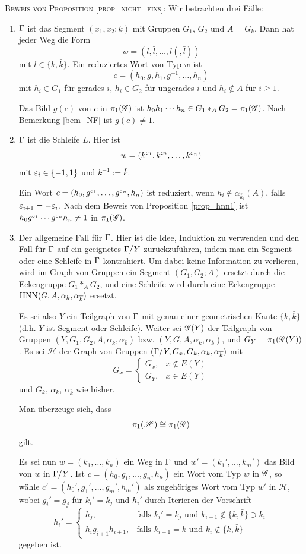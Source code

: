 \documentclass[a4paper, 12pt, twoside]{article}
\begin{document}
\textsc{Beweis von Proposition \ref{prop_nicht_eins}:}
Wir betrachten drei Fälle:
\begin{enumerate}
\item
$\Gamma$ ist das Segment $(x_1,x_2;k)$ mit Gruppen
$G_1$, $G_2$ und $A=G_k$. Dann hat jeder Weg die Form
\[
w = (l,\bar{l},\ldots,l(,\bar{l}))
\]
mit $l\in\{ k, \bar{k} \}$.
Ein reduziertes Wort von Typ $w$ ist
\[
c = (h_0,g,h_1,g^{-1},\ldots,h_n)
\]
mit $h_i\in G_1$ für gerades $i$, $h_i\in G_2$ für ungerades $i$
und $h_i\not\in A$ für $i\geq 1$.

Das Bild $g(c)$ von $c$ in $\pi_1(\mathscr{G})$ ist
$h_0 h_1\cdots h_n \in G_1 *_A G_2=\pi_1(\mathscr{G})$.
Nach Bemerkung \ref{bem_NF} ist $g(c)\neq 1$.

\item
$\Gamma$ ist die Schleife $L$. Hier ist
\[
w = (k^{\varepsilon_1},k^{\varepsilon_2},\ldots,k^{\varepsilon_n})
\]
mit $\varepsilon_i\in\{-1,1\}$ und $k^{-1}:=\bar{k}$.

Ein Wort $c=(h_0,g^{\varepsilon_1},\ldots,g^{\varepsilon_n},h_n)$ ist reduziert,
wenn $h_i\not\in \alpha_{\bar{k}_i}(A)$, falls $\varepsilon_{i+1}=-\varepsilon_i$.
Nach dem Beweis von Proposition \ref{prop_hnn1} ist
$h_0 g^{\varepsilon_1}\cdots g^{\varepsilon_n}h_n\neq 1$ in $\pi_1(\mathscr{G})$.

\item
Der allgemeine Fall für $\Gamma$. Hier ist die Idee, Induktion
zu verwenden und den Fall für $\Gamma$ auf ein geeignetes $\Gamma/Y$
zurückzuführen, indem man ein Segment oder eine Schleife in $\Gamma$
kontrahiert. Um dabei keine Information zu verlieren, wird im
Graph von Gruppen ein Segment $(G_1,G_2;A)$ ersetzt durch
die Eckengruppe $G_1*_A G_2$, und eine Schleife wird durch eine
Eckengruppe $\mathrm{HNN}(G,A,\alpha_k,\alpha_{\overline{k}})$ ersetzt.

Es sei also $Y$ ein Teilgraph von $\Gamma$ mit genau einer geometrischen
Kante $\{k,\bar{k}\}$ (d.h. $Y$ ist Segment oder Schleife).
Weiter sei $\mathscr{G}(Y)$ der Teilgraph von Gruppen
$(Y,G_1,G_2,A,\alpha_{k},\alpha_{\bar{k}})$ bzw.
$(Y,G,A,\alpha_{k},\alpha_{\bar{k}})$, und $G_Y=\pi_1(\mathscr{G}(Y))$.
Es sei $\mathscr{H}$ der Graph von Gruppen
$(\Gamma/Y,G_x,G_k,\alpha_k,\alpha_{\overline{k}})$ mit
\[
G_x = \left\{
\begin{matrix}
G_x, & x\not\in E(Y) \\
G_Y, & x\in E(Y)
\end{matrix}\right.
\]
und $G_k$, $\alpha_k$, $\alpha_{\bar{k}}$ wie bisher.

Man überzeuge sich, dass
\[
\pi_1(\mathscr{H}) \cong \pi_1(\mathscr{G})
\]
gilt.

Es sei nun $w=(k_1,\ldots,k_n)$ ein Weg in $\Gamma$ und
$w'=(k_1',\ldots,k_m')$ das Bild von $w$ in $\Gamma/Y$.
Ist $c=(h_0,g_1,\ldots,g_n,h_n)$ ein Wort vom Typ $w$ in $\mathscr{G}$,
so wähle
$c'=(h_0',g_1',\ldots,g_m',h_m')$ als zugehöriges Wort vom
Typ $w'$ in $\mathscr{H}$, wobei $g_i'=g_j$ für $k_i'=k_j$ und
$h_i'$ durch Iterieren der Vorschrift
\[
h_i' = \left\{
\begin{matrix}
h_j, &
\text{falls $k_i'=k_j$ und $k_{i+1}\not\in\{k,\bar{k}\}\ni k_i$}\\
h_i g_{i+1} h_{i+1}, &
\text{falls $k_{i+1}=k$ und $k_i\not\in\{k,\bar{k}\}$}
\end{matrix}\right.
\]
gegeben ist.


\end{enumerate}
\end{document}
